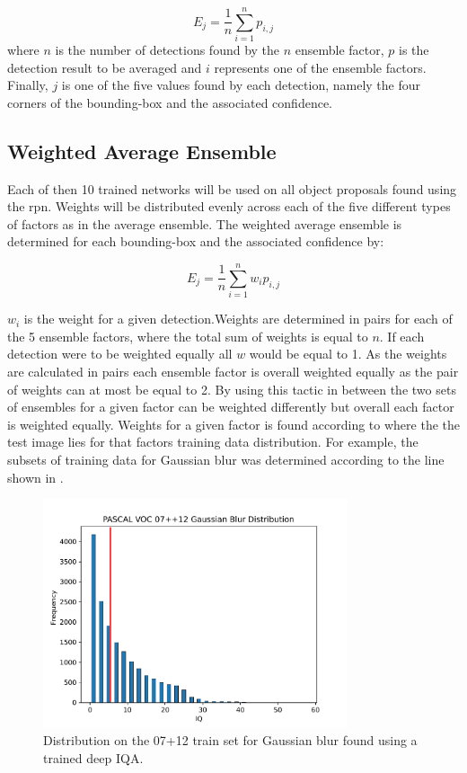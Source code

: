 \begin{equation}
  E_{j} = \frac{1}{n} \sum_{i=1}^{n} p_{i,j} 
\end{equation}
where $n$ is the number of detections found by the $n$ ensemble factor, $p$ is the detection result to be averaged and $i$ represents one of the ensemble factors. Finally, $j$ is one of the five values found by each detection, namely the four corners of the bounding-box and the associated confidence.


\subsection{Weighted Average Ensemble}
Each of then 10 trained networks will be used on all object proposals found using the \gls{rpn}. Weights will be distributed evenly across each of the five different types of factors as in the average ensemble. The weighted average ensemble is determined for each bounding-box and the associated confidence by:

\begin{equation}
	E_{j} = \frac{1}{n} \sum_{i=1}^{n} w_ip_{i,j} 
\end{equation}

$w_i$ is the weight for a given detection.Weights are determined in pairs for each of the 5 ensemble factors, where the total sum of weights is equal to $n$. If each detection were to be weighted equally all $w$ would be equal to 1. As the weights are calculated in pairs each ensemble factor is overall weighted equally as the pair of weights can at most be equal to 2. By using this tactic in between the two sets of ensembles for a given factor can be weighted differently but overall each factor is weighted equally.
Weights for a given factor is found according to where the the test image lies for that factors training data distribution. For example, the subsets of training data for Gaussian blur was determined according to the line shown in . 

\begin{figure}[H]
  \centering
    \includegraphics[width=0.8\textwidth]{Figs/Implementation/GaussianBlurdistred.pdf}
      \caption{Distribution on the 07+12 train set for Gaussian blur found using a trained deep IQA.}
    \label{fig:blur_dist}
\end{figure}

